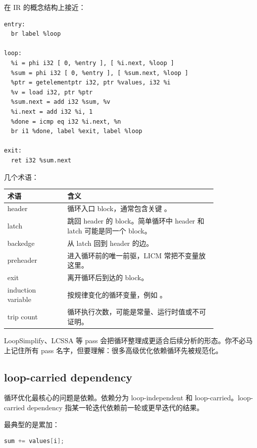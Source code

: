 在 IR 的概念结构上接近：

\begin{lstlisting}
entry:
  br label %loop

loop:
  %i = phi i32 [ 0, %entry ], [ %i.next, %loop ]
  %sum = phi i32 [ 0, %entry ], [ %sum.next, %loop ]
  %ptr = getelementptr i32, ptr %values, i32 %i
  %v = load i32, ptr %ptr
  %sum.next = add i32 %sum, %v
  %i.next = add i32 %i, 1
  %done = icmp eq i32 %i.next, %n
  br i1 %done, label %exit, label %loop

exit:
  ret i32 %sum.next
\end{lstlisting}

几个术语：

\begin{center}
\begin{tabular}{L{0.24\linewidth}L{0.60\linewidth}}
\toprule
术语 & 含义 \\
\midrule
header & 循环入口 block，通常包含关键 。 \\
latch & 跳回 header 的 block。简单循环中 header 和 latch 可能是同一个 block。 \\
backedge & 从 latch 回到 header 的边。 \\
preheader & 进入循环前的唯一前驱，LICM 常把不变量放这里。 \\
exit & 离开循环后到达的 block。 \\
induction variable & 按规律变化的循环变量，例如 。 \\
trip count & 循环执行次数，可能是常量、运行时值或不可证明。 \\
\bottomrule
\end{tabular}
\end{center}

LoopSimplify、LCSSA 等 pass 会把循环整理成更适合后续分析的形态。你不必马上记住所有 pass 名字，但要理解：很多高级优化依赖循环先被规范化。

\subsection{loop-carried dependency}

循环优化最核心的问题是依赖。依赖分为 loop-independent 和 loop-carried。loop-carried dependency 指某一轮迭代依赖前一轮或更早迭代的结果。

最典型的是累加：

\begin{lstlisting}[language=C++]
sum += values[i];
\end{lstlisting}

